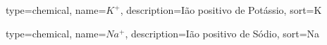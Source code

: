 
%


{%
  type=chemical,%
  name={$K^+$},%
  description={Ião positivo de Potássio},%
  sort={K}%
}

{%
  type=chemical,%
  name={$Na^+$},%
  description={Ião positivo de Sódio},%
  sort={Na}%
}
